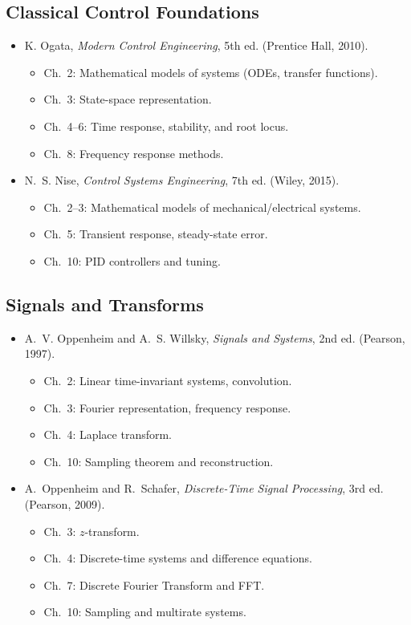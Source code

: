 \documentclass[11pt,a4paper]{article}
\begin{document}
	\subsection*{Classical Control Foundations}
	\begin{itemize}
		\item K. Ogata, \emph{Modern Control Engineering}, 5th ed. (Prentice Hall, 2010).  
		\begin{itemize}
			\item Ch.~2: Mathematical models of systems (ODEs, transfer functions).  
			\item Ch.~3: State-space representation.  
			\item Ch.~4--6: Time response, stability, and root locus.  
			\item Ch.~8: Frequency response methods.  
		\end{itemize}
		\item N.~S. Nise, \emph{Control Systems Engineering}, 7th ed. (Wiley, 2015).  
		\begin{itemize}
			\item Ch.~2--3: Mathematical models of mechanical/electrical systems.  
			\item Ch.~5: Transient response, steady-state error.  
			\item Ch.~10: PID controllers and tuning.  
		\end{itemize}
	\end{itemize}
	
	\subsection*{Signals and Transforms}
	\begin{itemize}
		\item A.~V. Oppenheim and A.~S. Willsky, \emph{Signals and Systems}, 2nd ed. (Pearson, 1997).  
		\begin{itemize}
			\item Ch.~2: Linear time-invariant systems, convolution.  
			\item Ch.~3: Fourier representation, frequency response.  
			\item Ch.~4: Laplace transform.  
			\item Ch.~10: Sampling theorem and reconstruction.  
		\end{itemize}
		\item A.~Oppenheim and R.~Schafer, \emph{Discrete-Time Signal Processing}, 3rd ed. (Pearson, 2009).  
		\begin{itemize}
			\item Ch.~3: $z$-transform.  
			\item Ch.~4: Discrete-time systems and difference equations.  
			\item Ch.~7: Discrete Fourier Transform and FFT.  
			\item Ch.~10: Sampling and multirate systems.  
		\end{itemize}
	\end{itemize}
	
\end{document}

